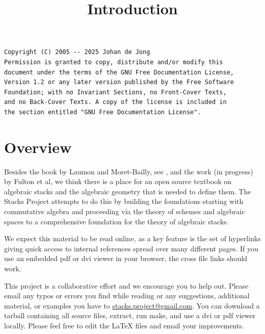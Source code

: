 

%


\title{Introduction}


\maketitle

\label{section-phantom}

\begin{verbatim}
Copyright (C) 2005 -- 2025 Johan de Jong
Permission is granted to copy, distribute and/or modify this
document under the terms of the GNU Free Documentation License,
Version 1.2 or any later version published by the Free Software
Foundation; with no Invariant Sections, no Front-Cover Texts,
and no Back-Cover Texts. A copy of the license is included in
the section entitled "GNU Free Documentation License".
\end{verbatim}

\tableofcontents


\section{Overview}
\label{section-overview}

\noindent
Besides the book by Laumon and Moret-Bailly, see \cite{LM-B}, and the work
(in progress) by Fulton et al, we think there is a place for an open source
textbook on algebraic stacks and the algebraic geometry that is needed
to define them. The Stacks Project attempts to do this by building the
foundations starting with commutative algebra and proceeding via the
theory of schemes and algebraic spaces to a comprehensive foundation for
the theory of algebraic stacks.

\medskip\noindent
We expect this material to be read online, as a key feature is the set of hyperlinks
giving quick access to internal references spread over many different pages.
If you use an embedded pdf or dvi viewer in your browser, the cross file
links should work.

\medskip\noindent
This project is a collaborative effort and we encourage you to help out.
Please email any typos or errors you find while reading or
any suggestions, additional material, or examples you have to
\href{mailto:stacks.project@gmail.com}{stacks.project@gmail.com}.
You can download a tarball containing all source files, extract,
run make, and use a dvi or pdf viewer locally. Please feel free to
edit the LaTeX files and email your improvements.


